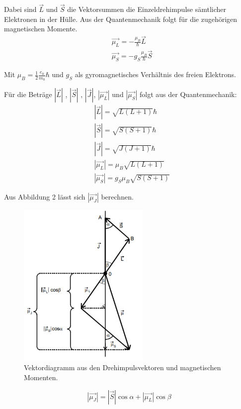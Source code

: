 Dabei sind $\vec{L}$ und $\vec{S}$ die Vektorsummen die Einzeldrehimpulse sämtlicher
Elektronen in der Hülle.
Aus der Quantenmechanik folgt für die zugehörigen magnetischen Momente.
\begin{align}
  &\vec{\mu_L} = - \frac{\mu_B}{\hbar} \vec{L} \\
  &\vec{\mu_S} = -g_S \frac{\mu_B}{\hbar} \vec{S}
\end{align}

Mit $\mu_B = \frac{1}{2} \frac{e_0}{m_0} \hbar$ und $g_S$ als gyromagnetisches Verhältnis
des freien Elektrons.

Für die Beträge $|\vec{L}|$ , $|\vec{S}|$ , $|\vec{J}|$, $|\vec{\mu_L}|$ und $|\vec{\mu_S}|$ folgt aus der Quantenmechanik:
\begin{align}
  &|\vec{L}| = \sqrt{L(L+1)} \hbar \\
  &|\vec{S}| = \sqrt{S(S+1)} \hbar \\
  &|\vec{J}| = \sqrt{J(J+1)} \hbar \\
  &|\vec{\mu_L}| = \mu_B \sqrt{L(L+1)}  \\
  &|\vec{\mu_S}| = g_S \mu_B \sqrt{S(S+1)}
\end{align}

Aus Abbildung 2 lässt sich $|\vec{\mu_J}|$ berechnen.

\begin{figure}[H]
  \centering
  \includegraphics[height=8cm]{geometrie.PNG}
  \caption{Vektordiagramm aus den Drehimpulsvektoren und magnetischen Momenten. \cite{sample}}
  \label{fig:Linienspektrum}
\end{figure}

\begin{equation}
  |\vec{\mu_J}| = |\vec{S}| \cos{\alpha} + |\vec{\mu_L}| \cos{\beta}
\end{equation}

